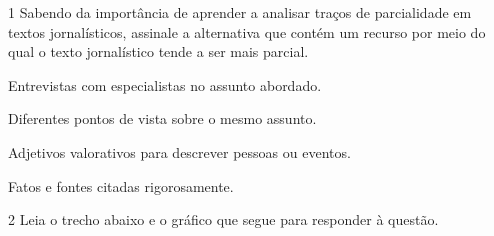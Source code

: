 
\num{1} Sabendo da importância de aprender a analisar traços de parcialidade em
textos jornalísticos, assinale a alternativa que contém um recurso por meio
do qual o texto jornalístico tende a ser mais parcial.

\begin{escolha}

  \item Entrevistas com especialistas no assunto abordado.
  \item Diferentes pontos de vista sobre o mesmo assunto.
  \item Adjetivos valorativos para descrever pessoas ou eventos.
  \item Fatos e fontes citadas rigorosamente. 

\end{escolha}


\num{2} Leia o trecho abaixo e o gráfico que segue para responder à questão.

